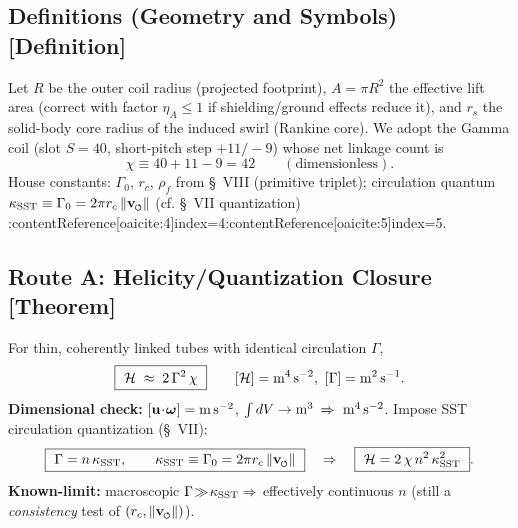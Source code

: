 \documentclass[10pt,reprint,aps,onecolumn,nofootinbib]{revtex4-2}
\newcommand{\vnorm}{\lVert \mathbf{v}_{\mkern-2mu\scriptscriptstyle\boldsymbol{\circlearrowleft}} \rVert}               %
\newcommand{\rc}{r_c}                                    %
\providecommand{\rc}{r_c}
\newcommand{\rhoF}{\rho_{\!f}}     %
\begin{document}
    \subsection{Definitions (Geometry and Symbols) [Definition]}
        \label{subsec:GammaDefs}
        Let $R$ be the outer coil radius (projected footprint), $A=\pi R^2$ the effective lift area (correct with factor $\eta_A\le 1$ if shielding/ground effects reduce it), and $r_s$ the solid-body core radius of the induced swirl (Rankine core). We adopt the Gamma coil (slot $S=40$, short-pitch step $+11/-9$) whose net linkage count is
        \[
            \chi \equiv 40+11-9=42\qquad(\text{dimensionless}).
        \]
        House constants: $\Gamma_0$, $\rc$, $\rhoF$ from \S~VIII (primitive triplet); circulation quantum $\kappa_{\rm SST} \equiv \Gamma_0 = 2\pi \rc\,\vnorm$ (cf. \S~VII quantization) :contentReference[oaicite:4]{index=4}:contentReference[oaicite:5]{index=5}.

    \subsection{Route A: Helicity/Quantization Closure [Theorem]}
        \label{subsec:HelicityRoute}
        For thin, coherently linked tubes with identical circulation $\Gamma$,
        \begin{equation}
            \boxed{\ \mathcal{H} \;\approx\; 2\,\Gamma^{2}\, \chi\ }\qquad [\mathcal{H}]={\rm m^4\,s^{-2}},\ [\Gamma]={\rm m^2\,s^{-1}}.
        \end{equation}
        \textbf{Dimensional check:} $[\mathbf{u}\!\cdot\!\boldsymbol{\omega}]={\rm m\,s^{-2}}$, $\int dV\to{\rm m^3}$ $\Rightarrow\ {\rm m^4\,s^{-2}}$.
        Impose SST circulation quantization (\S~VII):
        \begin{equation}
            \boxed{\ \Gamma = n\,\kappa_{\rm SST},\qquad \kappa_{\rm SST} \equiv \Gamma_0 = 2\pi \rc\,\vnorm\ }\quad\Rightarrow\quad
            \boxed{\ \mathcal{H}=2\,\chi\,n^2\,\kappa_{\rm SST}^{2}\ }.
        \end{equation}
        \textbf{Known-limit:} macroscopic $\Gamma\!\gg\!\kappa_{\rm SST}\Rightarrow$ effectively continuous $n$ (still a \emph{consistency} test of $(\rc,\vnorm)$).
\end{document}
